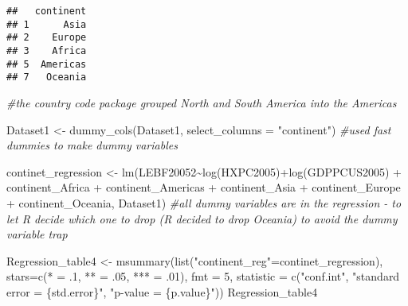 \documentclass[
]{article}
\newenvironment{Shaded}{\begin{snugshade}}{\end{snugshade}}
\newcommand{\AttributeTok}[1]{\textcolor[rgb]{0.77,0.63,0.00}{#1}}
\newcommand{\CommentTok}[1]{\textcolor[rgb]{0.56,0.35,0.01}{\textit{#1}}}
\newcommand{\DecValTok}[1]{\textcolor[rgb]{0.00,0.00,0.81}{#1}}
\newcommand{\FunctionTok}[1]{\textcolor[rgb]{0.00,0.00,0.00}{#1}}
\newcommand{\NormalTok}[1]{#1}
\newcommand{\OtherTok}[1]{\textcolor[rgb]{0.56,0.35,0.01}{#1}}
\newcommand{\SpecialCharTok}[1]{\textcolor[rgb]{0.00,0.00,0.00}{#1}}
\newcommand{\StringTok}[1]{\textcolor[rgb]{0.31,0.60,0.02}{#1}}
\begin{document}
\begin{verbatim}
##   continent
## 1      Asia
## 2    Europe
## 3    Africa
## 5  Americas
## 7   Oceania
\end{verbatim}

\begin{Shaded}
\begin{Highlighting}[]
\CommentTok{\#the country code package grouped North and South America into the Americas}

\NormalTok{Dataset1 }\OtherTok{\textless{}{-}} \FunctionTok{dummy\_cols}\NormalTok{(Dataset1, }\AttributeTok{select\_columns =} \StringTok{"continent"}\NormalTok{) }\CommentTok{\#used fast dummies to make dummy variables}

\NormalTok{continet\_regression }\OtherTok{\textless{}{-}} \FunctionTok{lm}\NormalTok{(LEBF20052}\SpecialCharTok{\textasciitilde{}}\FunctionTok{log}\NormalTok{(HXPC2005)}\SpecialCharTok{+}\FunctionTok{log}\NormalTok{(GDPPCUS2005) }\SpecialCharTok{+}\NormalTok{ continent\_Africa }\SpecialCharTok{+}
\NormalTok{                            continent\_Americas }\SpecialCharTok{+}\NormalTok{ continent\_Asia }\SpecialCharTok{+}\NormalTok{ continent\_Europe}
                          \SpecialCharTok{+}\NormalTok{ continent\_Oceania, Dataset1)}
\CommentTok{\#all dummy variables are in the regression {-} to let R decide which one to drop (R decided to drop Oceania) to avoid the dummy variable trap}

\NormalTok{Regression\_table4 }\OtherTok{\textless{}{-}} \FunctionTok{msummary}\NormalTok{(}\FunctionTok{list}\NormalTok{(}\StringTok{"continent\_reg"}\OtherTok{=}\NormalTok{continet\_regression),}
                              \AttributeTok{stars=}\FunctionTok{c}\NormalTok{(}\StringTok{\textquotesingle{}*\textquotesingle{}} \OtherTok{=}\NormalTok{ .}\DecValTok{1}\NormalTok{, }\StringTok{\textquotesingle{}**\textquotesingle{}} \OtherTok{=}\NormalTok{ .}\DecValTok{05}\NormalTok{, }\StringTok{\textquotesingle{}***\textquotesingle{}} \OtherTok{=}\NormalTok{ .}\DecValTok{01}\NormalTok{),}
                               \AttributeTok{fmt =} \DecValTok{5}\NormalTok{,  }\AttributeTok{statistic =} \FunctionTok{c}\NormalTok{(}\StringTok{"conf.int"}\NormalTok{,  }\StringTok{"standard error = \{std.error\}"}\NormalTok{, }
                                            \StringTok{"p{-}value = \{p.value\}"}\NormalTok{))}
\NormalTok{Regression\_table4}
\end{Highlighting}
\end{Shaded}
\end{document}
